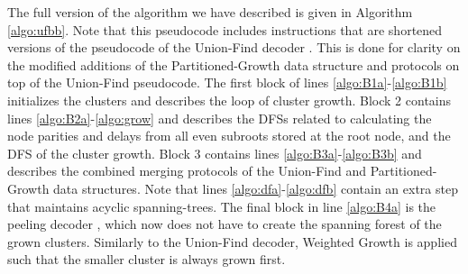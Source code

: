 The full version of the algorithm we have described is given in Algorithm \ref{algo:ufbb}. Note that this pseudocode includes instructions that are shortened versions of the pseudocode of the Union-Find decoder \cite{delfosse2017almost}. This is done for clarity on the modified additions of the Partitioned-Growth data structure and protocols on top of the Union-Find pseudocode. The first block of lines \ref{algo:B1a}-\ref{algo:B1b} initializes the clusters and describes the loop of cluster growth. Block 2 contains lines \ref{algo:B2a}-\ref{algo:grow} and describes the DFSs related to calculating the node parities and delays from all even subroots stored at the root node, and the DFS of the cluster growth. Block 3 contains lines \ref{algo:B3a}-\ref{algo:B3b} and describes the combined merging protocols of the Union-Find and Partitioned-Growth data structures. Note that lines \ref{algo:dfa}-\ref{algo:dfb} contain an extra step that maintains acyclic spanning-trees. The final block in line \ref{algo:B4a} is the peeling decoder \cite{delfosse2017linear}, which now does not have to create the spanning forest of the grown clusters. Similarly to the Union-Find decoder, Weighted Growth is applied such that the smaller cluster is always grown first. 
